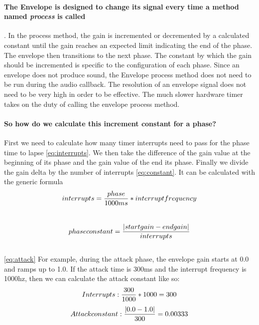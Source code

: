 \documentclass[acmlarge,screen]{acmart}
\begin{document}
	\paragraph{The Envelope is designed to change its signal every time a method named \textit{process} is called}. In the process method, the gain is incremented or decremented by a calculated constant until the gain reaches an expected limit indicating the end of the phase. The envelope then transitions to the next phase. The constant by which the gain should be incremented is specific to the configuration of each phase. Since an envelope does not produce sound, the Envelope process method does not need to be run during the audio callback. The resolution of an envelope signal does not need to be very high in order to be effective. The much slower hardware timer takes on the duty of calling the envelope process method.
	
	\paragraph{So how do we calculate this increment constant for a phase?} First we need to calculate how many timer interrupts need to pass for the phase time to lapse \eqref{eq:interrupts}. We then take the difference of the gain value at the beginning of its phase and the gain value of the end its phase. Finally we divide the gain delta by the number of interrupts \eqref{eq:constant}. It can be calculated with the generic formula  \\
		
	\begin{equation}
		\large
		interrupts=\frac{phase}{1000ms} * interrupt frequency
		\label{eq:interrupts}
	\end{equation}\\

	\begin{equation}
		\large
		phase constant = \frac{|start gain - end gain|}{interrupts}
		\label{eq:constant}
	\end{equation}\\

	
	\eqref{eq:attack} For example, during the attack phase, the envelope gain starts at 0.0 and ramps up to 1.0. If the attack time is 300ms and the interrupt frequency is 1000hz, then we can calculate the attack constant like so:\\
	
	\begin{equation}
		\large
		Interrupts: \frac{300}{1000}*1000=300
		\label{eq:attack}
	\end{equation}
	\begin{equation}
		\large
		Attack constant: \frac{|0.0 - 1.0|}{300}=0.00333
		\label{eq:attack}
	\end{equation}
	
\end{document}
